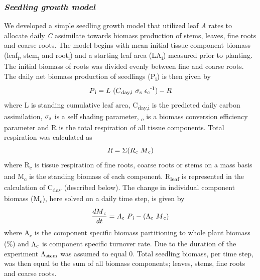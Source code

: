 \documentclass[a4paper]{article}\usepackage[]{graphicx}\usepackage[]{color}
\begin{document}
\subsubsection*{\textit{Seedling growth model}}

We developed a simple seedling growth model that utilized leaf \textit{A} rates to allocate daily \textit{C} assimilate towards biomass production of stems, leaves, fine roots and coarse roots. The model begins with mean initial tissue component biomass (leaf\textsubscript{i}, stem\textsubscript{i} and root\textsubscript{i}) and a starting leaf area (LA\textsubscript{i}) measured prior to planting. The initial biomass of roots was divided evenly between fine and coarse roots. The daily net biomass production of seedlings (P\textsubscript{i}) is then given by
\begin{equation} P\textsubscript{i}=L~(C\textsubscript{day,i}~\sigma\textsubscript{s}~\epsilon\textsubscript{c}\textsuperscript{-1})-R
\label{eq:prod}
\end{equation}
where L is standing cumulative leaf area, C\textsubscript{day,i} is the predicted daily carbon assimilation, $\sigma\textsubscript{s}$ is a self shading parameter, \textepsilon\textsubscript{c} is a biomass conversion efficiency parameter and R is the total respiration of all tissue components. Total respiration was calculated as 
\begin{equation} R=\Sigma(R\textsubscript{c}~M\textsubscript{c})
\label{eq:resp}
\end{equation}
where R\textsubscript{c} is tissue respiration of fine roots, coarse roots or stems on a mass basis and M\textsubscript{c} is the standing biomass of each component. R\textsubscript{leaf} is represented in the calculation of C\textsubscript{day} (described below). The change in individual component biomass (M\textsubscript{c}), here solved on a daily time step, is given by
\begin{equation} \frac{dM\textsubscript{c}}{dt}=A\textsubscript{c}~P\textsubscript{i}-(\Lambda\textsubscript{c}~M\textsubscript{c})
\label{eq:mass}
\end{equation}
where A\textsubscript{c} is the component specific biomass partitioning  to whole plant biomass (\%) and $\Lambda\textsubscript{c}$ is component specific turnover rate. Due to the duration of the experiment $\Lambda\textsubscript{stem}$ was assumed to equal 0.  Total seedling biomass, per time step, was then equal to the sum of all biomass components; leaves, stems, fine roots and coarse roots. 
\end{document}
